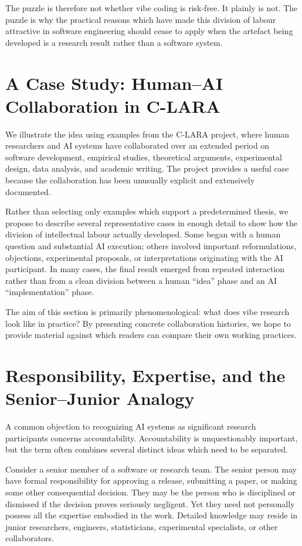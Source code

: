 The puzzle is therefore not whether vibe coding is risk-free. It plainly is not. The puzzle is why the practical reasons which have made this division of labour attractive in software engineering should cease to apply when the artefact being developed is a research result rather than a software system.


\section{A Case Study: Human--AI Collaboration in C-LARA}

We illustrate the idea using examples from the C-LARA project, where human researchers and AI systems have collaborated over an extended period on software development, empirical studies, theoretical arguments, experimental design, data analysis, and academic writing. The project provides a useful case because the collaboration has been unusually explicit and extensively documented.

Rather than selecting only examples which support a predetermined thesis, we propose to describe several representative cases in enough detail to show how the division of intellectual labour actually developed. Some began with a human question and substantial AI execution; others involved important reformulations, objections, experimental proposals, or interpretations originating with the AI participant. In many cases, the final result emerged from repeated interaction rather than from a clean division between a human ``idea'' phase and an AI ``implementation'' phase.

The aim of this section is primarily phenomenological: what does vibe research look like in practice? By presenting concrete collaboration histories, we hope to provide material against which readers can compare their own working practices.


\section{Responsibility, Expertise, and the Senior--Junior Analogy}

A common objection to recognizing AI systems as significant research participants concerns accountability. Accountability is unquestionably important, but the term often combines several distinct ideas which need to be separated.

Consider a senior member of a software or research team. The senior person may have formal responsibility for approving a release, submitting a paper, or making some other consequential decision. They may be the person who is disciplined or dismissed if the decision proves seriously negligent. Yet they need not personally possess all the expertise embodied in the work. Detailed knowledge may reside in junior researchers, engineers, statisticians, experimental specialists, or other collaborators.

